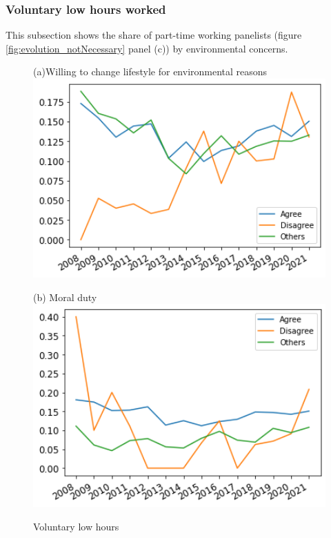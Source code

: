 \documentclass[12pt]{article}
\begin{document}
\newpage
\subsubsection{Voluntary low hours worked}
This subsection shows the share of part-time working panelists (figure \ref{fig:evolution_notNecessary} panel (c)) by environmental concerns. 

\begin{figure}[h!!]
	\centering	
	\caption{Voluntary low hours }\label{fig:evolution_wtr_willingtochange}	
	\begin{minipage}[h!!]{0.32\textwidth}  
		\centering\footnotesize{(a)Willing to change lifestyle for environmental reasons}
		\includegraphics[width=1\textwidth]{../codding_data/results/liss/broad_groups_work_redcuctionqk20a175_actual.png}
	\end{minipage}
	\begin{minipage}[h!!]{0.32\textwidth}  
	\centering\footnotesize{(b) Moral duty}
	\includegraphics[width=1\textwidth]{../codding_data/results/liss/broad_groups_work_redcuctionqk20a183_actual.png}

\end{minipage}
\end{figure}
\end{document}
